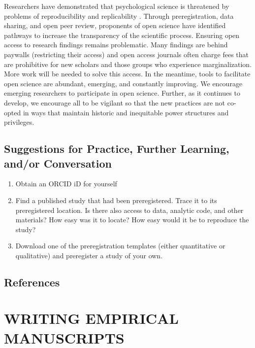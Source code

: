 \documentclass[
  11pt,
]{book}
\providecommand{\tightlist}{%
  \setlength{\itemsep}{0pt}\setlength{\parskip}{0pt}}
\begin{document}
Researchers have demonstrated that psychological science is threatened by problems of reproducibility and replicability \citep{open_science_collaboration_estimating_2015}. Through preregistration, data sharing, and open peer review, proponents of open science have identified pathways to increase the transparency of the scientific process. Ensuring open access to research findings remains problematic. Many findings are behind paywalls (restricting their access) and open access journals often charge fees that are prohibitive for new scholars and those groups who experience marginalization. More work will be needed to solve this access. In the meantime, tools to facilitate open science are abundant, emerging, and constantly improving. We encourage emerging researchers to participate in open science. Further, as it continues to develop, we encourage all to be vigilant so that the new practices are not co-opted in ways that maintain historic and inequitable power structures and privileges.

\hypertarget{suggestions-for-practice-further-learning-andor-conversation}{%
\section{Suggestions for Practice, Further Learning, and/or Conversation}\label{suggestions-for-practice-further-learning-andor-conversation}}

\begin{enumerate}
\def\labelenumi{\arabic{enumi}.}
\tightlist
\item
  Obtain an ORCID iD for yourself
\item
  Find a published study that had been preregistered. Trace it to its preregistered location. Is there also access to data, analytic code, and other materials? How easy was it to locate? How easy would it be to reproduce the study?
\item
  Download one of the preregistration templates (either quantitative or qualitative) and preregister a study of your own.
\end{enumerate}

\hypertarget{references}{%
\section{References}\label{references}}

\hypertarget{writing-empirical-manuscripts}{%
\chapter*{WRITING EMPIRICAL MANUSCRIPTS}\label{writing-empirical-manuscripts}}
\end{document}
